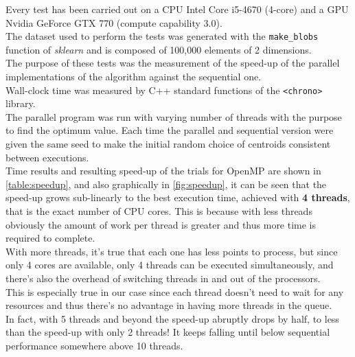 \documentclass[10pt,twocolumn,letterpaper]{article}
\begin{document}
Every test has been carried out on a CPU Intel Core i5-4670 (4-core) and a GPU Nvidia GeForce GTX 770 (compute capability 3.0).\\
The dataset used to perform the tests was generated with the \texttt{make\_blobs} function of \textit{sklearn} and is composed of 100,000 elements of 2 dimensions.\\
The purpose of these tests was the measurement of the speed-up of the parallel implementations of the algorithm against the sequential one.\\
Wall-clock time was measured by C++ standard functions of the \texttt{<chrono>} library.\\
The parallel program was run with varying number of threads with the purpose to find the optimum value. Each time the parallel and sequential version were given the same seed to make the initial random choice of centroids consistent between executions.\\
Time results and resulting speed-up of the trials for OpenMP are shown in \cref{table:speedup}, and also graphically in \cref{fig:speedup}, it can be seen that the speed-up grows sub-linearly to the best execution time, achieved with \textbf{4 threads}, that is the exact number of CPU cores. This is because with less threads obviously the amount of work per thread is greater and thus more time is required to complete.\\ With more threads, it's true that each one has less points to process, but since only 4 cores are available, only 4 threads can be executed simultaneously, and there's also the overhead of switching threads in and out of the processors.\\
This is especially true in our case since each thread doesn't need to wait for any resources and thus there's no advantage in having more threads in the queue.\\
In fact, with 5 threads and beyond the speed-up abruptly drops by half, to less than the speed-up with only 2 threads! It keeps falling until below sequential performance somewhere above 10 threads.
\end{document}
